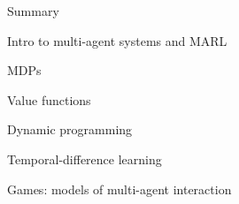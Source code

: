         




\begin{frame}{Summary}

\blist
    \item Intro to multi-agent systems and MARL
    \item MDPs
    \item Value functions
    \item Dynamic programming
    \item Temporal-difference learning
\elist
{}
\blist
    \item Games: models of multi-agent interaction
\elist

\end{frame}

